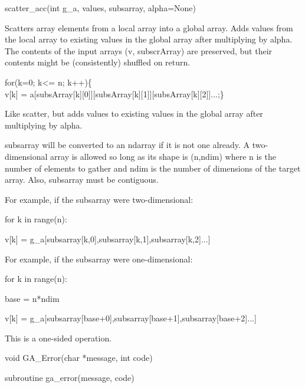 \documentclass[12pt]{article}
\begin{document}
\begin{pyapi}
\begin{pycode}
scatter_acc(int g_a, values, subsarray, alpha=None)
\end{pycode}
\end{pyapi}

\ncoll

\begin{desc}

Scatters array elements from a local array into a global array. Adds
values from the local array to existing values in the global array
after multiplying by alpha. The contents of the input arrays (v, subscrArray)
are preserved, but their contents might be (consistently) shuffled on return.

for(k=0; k<= n; k++)\{\\v[k] = a[subsArray[k][0]][subsArray[k][1]][subsArray[k][2]]...;\}\

Like scatter, but adds values to existing values in the global array after
multiplying by alpha.

subsarray will be converted to an ndarray if it is not one already. A
two-dimensional array is allowed so long as its shape is (n,ndim) where n is
the number of elements to gather and ndim is the number of dimensions of the
target array. Also, subsarray must be contiguous.

For example, if the subsarray were two-dimensional:

for k in range(n):

    v[k] = g_a[subsarray[k,0],subsarray[k,1],subsarray[k,2]...]

For example, if the subsarray were one-dimensional:


for k in range(n):

    base = n*ndim

    v[k] = g_a[subsarray[base+0],subsarray[base+1],subsarray[base+2]...]

This is a one-sided operation.

\end{desc}


\begin{capi}
\begin{ccode}
void GA_Error(char *message, int code)
\end{ccode}
\begin{funcargs}
\end{funcargs}
\end{capi}
\begin{fapi}
\begin{fcode}
subroutine ga_error(message, code)
\end{fcode}
\begin{funcargs}
\end{funcargs}
\end{fapi}
\end{document}
